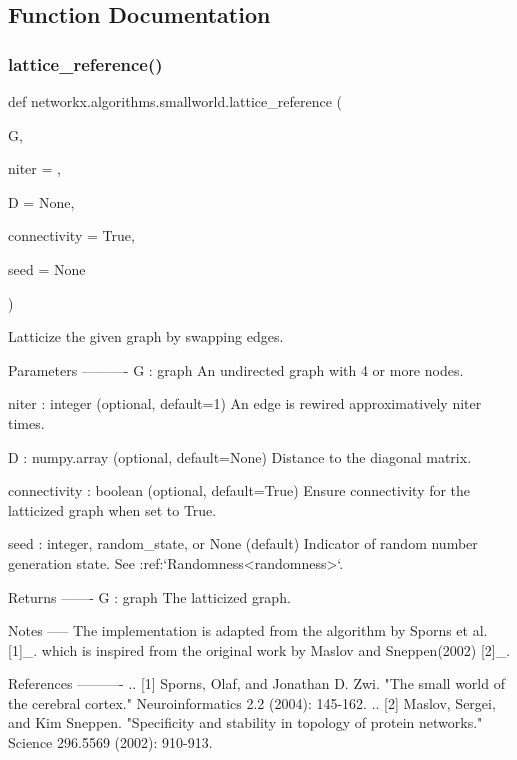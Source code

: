 \subsection{Function Documentation}
\mbox{\label{namespacenetworkx_1_1algorithms_1_1smallworld_a1ee60cf9f8bcd25f19404f14274e66a6}} 
\subsubsection{\texorpdfstring{lattice\+\_\+reference()}{lattice\_reference()}}
{\footnotesize\ttfamily def networkx.\+algorithms.\+smallworld.\+lattice\+\_\+reference (\begin{DoxyParamCaption}\item[{}]{G,  }\item[{}]{niter = {},  }\item[{}]{D = {\ttfamily None},  }\item[{}]{connectivity = {\ttfamily True},  }\item[{}]{seed = {\ttfamily None} }\end{DoxyParamCaption})}

\begin{DoxyVerb}Latticize the given graph by swapping edges.

Parameters
----------
G : graph
    An undirected graph with 4 or more nodes.

niter : integer (optional, default=1)
    An edge is rewired approximatively niter times.

D : numpy.array (optional, default=None)
    Distance to the diagonal matrix.

connectivity : boolean (optional, default=True)
    Ensure connectivity for the latticized graph when set to True.

seed : integer, random_state, or None (default)
    Indicator of random number generation state.
    See :ref:`Randomness<randomness>`.

Returns
-------
G : graph
    The latticized graph.

Notes
-----
The implementation is adapted from the algorithm by Sporns et al. [1]_.
which is inspired from the original work by Maslov and Sneppen(2002) [2]_.

References
----------
.. [1] Sporns, Olaf, and Jonathan D. Zwi.
   "The small world of the cerebral cortex."
   Neuroinformatics 2.2 (2004): 145-162.
.. [2] Maslov, Sergei, and Kim Sneppen.
   "Specificity and stability in topology of protein networks."
   Science 296.5569 (2002): 910-913.
\end{DoxyVerb}
 \mbox{\label{namespacenetworkx_1_1algorithms_1_1smallworld_a6c56f8a4aad98862a5fd6b697961b5fc}} 
